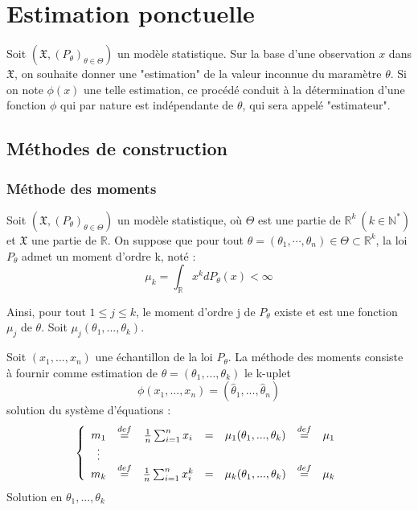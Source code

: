 \section{Estimation ponctuelle}
Soit $(\mathfrak{X},(P_{\theta})_{\theta\in\Theta})$ un modèle statistique. Sur la base d'une observation $x$ dans $\mathfrak{X}$, on souhaite donner une "estimation" de la valeur inconnue du maramètre $\theta$. Si on note $\phi(x)$ une telle estimation, ce procédé conduit à la détermination d'une fonction $\phi$ qui par nature est indépendante de $\theta$, qui sera appelé "estimateur".


\subsection{Méthodes de construction}
\subsubsection{Méthode des moments}
Soit $(\mathfrak{X},(P_{\theta})_{\theta\in\Theta})$ un modèle statistique, où $\Theta$ est une partie de $\mathbb{R}^k\ (k\in\mathbb{N}^*)$ et $\mathfrak{X}$ une partie de $\mathbb{R}$. On suppose que pour tout $\theta=(\theta_1,\cdots,\theta_n)\in\Theta\subset\mathbb{R}^k$, la loi $P_{\theta}$ admet un moment d'ordre k, noté :
\[\mu_k=\int_{\mathbb{R}} x^kdP_{\theta}(x)<\infty\]

Ainsi, pour tout $1\leq j\leq k$, le moment d'ordre j de $P_{\theta}$ existe et est une fonction $\mu_j$ de $\theta$. Soit $\mu_j(\theta_1,...,\theta_k)$. 

Soit $(x_1,...,x_n)$ une échantillon de la loi $P_{\theta}$. La méthode des moments consiste à fournir comme estimation de $\theta=(\theta_1,...,\theta_k)$ le k-uplet
\[\phi(x_1,...,x_n)=(\hat{\theta}_1,...,\hat{\theta}_n)\]
solution du système d'équations : 
\[
	\left\{
		\begin{array}{c c c c c c c}
			m_1 &\stackrel{def}{=}& \frac{1}{n}\sum_{i=1}^n x_i &=& \mu_1(\theta_1,...,\theta_k)&\stackrel{def}{=}&\mu_1\\
			\vdots\\
			m_k &\stackrel{def}{=}& \frac{1}{n}\sum_{i=1}^n x_i^k &=& \mu_k(\theta_1,...,\theta_k)&\stackrel{def}{=}&\mu_k\\
		\end{array}
	\right.
\]
Solution en $\theta_1,...,\theta_k$

